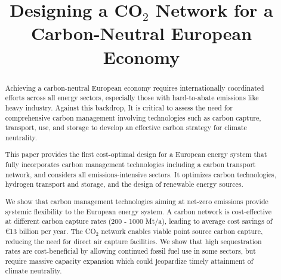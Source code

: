 \documentclass[conference]{IEEEtran}
\newcommand{\carbon}{CO$_2$}
\begin{document}
\title{Designing a \carbon{} Network for a Carbon-Neutral European Economy}


\author{

}

\maketitle

\begin{abstract}
    Achieving a carbon-neutral European economy requires internationally coordinated efforts across all energy sectors, especially those with hard-to-abate emissions like heavy industry. Against this backdrop, It is critical to assess the need for comprehensive carbon management involving technologies such as carbon capture, transport, use, and storage to develop an effective carbon strategy for climate neutrality.

    This paper provides the first cost-optimal design for a European energy system that fully incorporates carbon management technologies including a carbon transport network, and considers all emissions-intensive sectors. It optimizes carbon technologies, hydrogen transport and storage, and the design of renewable energy sources.

    We show that carbon management technologies aiming at net-zero emissions provide systemic flexibility to the European energy system. A carbon network is cost-effective at different carbon capture rates (200 - 1000 Mt/a), leading to average cost savings of €13 billion per year. The \carbon{} network enables viable point source carbon capture, reducing the need for direct air capture facilities. We show that high sequestration rates are cost-beneficial by allowing continued fossil fuel use in some sectors, but require massive capacity expansion which could jeopardize timely attainment of climate neutrality.

\end{abstract}
\end{document}
